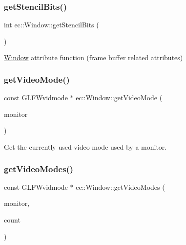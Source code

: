 \subsubsection{\texorpdfstring{get\+Stencil\+Bits()}{getStencilBits()}}
{\footnotesize\ttfamily int ec\+::\+Window\+::get\+Stencil\+Bits (\begin{DoxyParamCaption}{ }\end{DoxyParamCaption})\hspace{0.3cm}{\ttfamily [static]}}

\mbox{\hyperlink{classec_1_1_window}{Window}} attribute function (frame buffer related attributes) \mbox{\label{classec_1_1_window_a1be4ec4d16ead306b318e69b166d9bc9}} 
\subsubsection{\texorpdfstring{get\+Video\+Mode()}{getVideoMode()}}
{\footnotesize\ttfamily const G\+L\+F\+Wvidmode $\ast$ ec\+::\+Window\+::get\+Video\+Mode (\begin{DoxyParamCaption}\item[{G\+L\+F\+Wmonitor $\ast$}]{monitor }\end{DoxyParamCaption})\hspace{0.3cm}{\ttfamily [static]}}

Get the currently used video mode used by a monitor. \mbox{\label{classec_1_1_window_aeedb0015b967b685cd4e8facc3b37a77}} 
\subsubsection{\texorpdfstring{get\+Video\+Modes()}{getVideoModes()}}
{\footnotesize\ttfamily const G\+L\+F\+Wvidmode $\ast$ ec\+::\+Window\+::get\+Video\+Modes (\begin{DoxyParamCaption}\item[{G\+L\+F\+Wmonitor $\ast$}]{monitor,  }\item[{int $\ast$}]{count }\end{DoxyParamCaption})\hspace{0.3cm}{\ttfamily [static]}}

